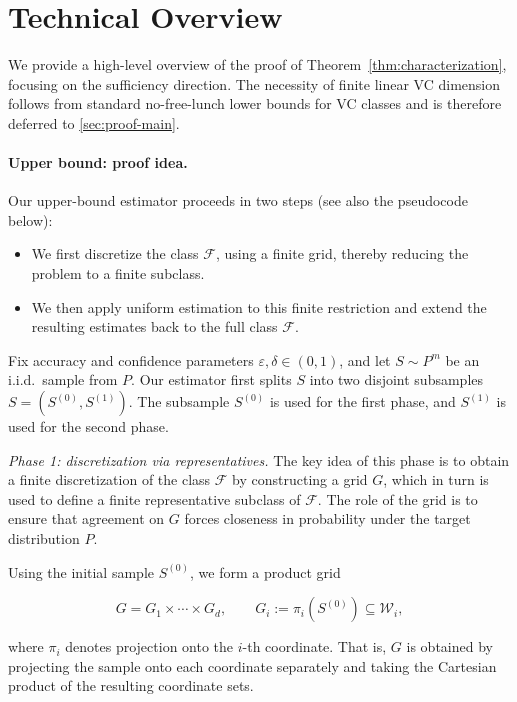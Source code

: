 \documentclass[arxiv]{colt2026}
\newcommand{\F}{\mathcal{F}}
\newcommand{\W}{\mathcal{W}}
\newcommand{\eps}{\varepsilon}
\begin{document}
\section{Technical Overview}\label{sec:technicaloverview}
We provide a high-level overview of the proof of
Theorem~\ref{thm:characterization}, focusing on the sufficiency direction.
The necessity of finite linear VC dimension follows from standard no-free-lunch
lower bounds for VC classes and is therefore deferred to \autoref{sec:proof-main}.
\vspace{-0.5em}
\paragraph{Upper bound: proof idea.}
Our upper-bound estimator proceeds in two steps (see also the pseudocode below):
\begin{itemize}
\item We first discretize the class $\F$, using a finite grid, thereby
reducing the problem to a finite subclass.
\item We then apply uniform estimation to this finite restriction and extend the
resulting estimates back to the full class $\F$.
\end{itemize}

Fix accuracy and confidence parameters $\eps,\delta\in(0,1)$, and let
$S\sim P^{m}$ be an i.i.d.\ sample from $P$.
Our estimator first splits $S$ into two disjoint subsamples $S=(S^{(0)},S^{(1)})$.
The subsample $S^{(0)}$ is used for the first phase, and $S^{(1)}$ is used
for the second phase.

\smallskip

\noindent\emph{Phase 1: discretization via representatives.}
The key idea of this phase is to obtain a finite discretization of the class $\F$ by constructing a grid $G$, which in turn is used to define a finite
representative subclass of $\F$.
The role of the grid is to ensure that agreement on $G$ forces closeness in
probability under the target distribution $P$.

Using the initial sample $S^{(0)}$, we form a product grid

\vspace{-0.5em}
\[
G = G_1 \times \cdots \times G_d,
\qquad
G_i := \pi_i(S^{(0)}) \subseteq \W_i ,
\]


where $\pi_i$ denotes projection onto the $i$-th coordinate.
That is, $G$ is obtained by projecting the sample onto each coordinate separately
and taking the Cartesian product of the resulting coordinate sets.
\end{document}
